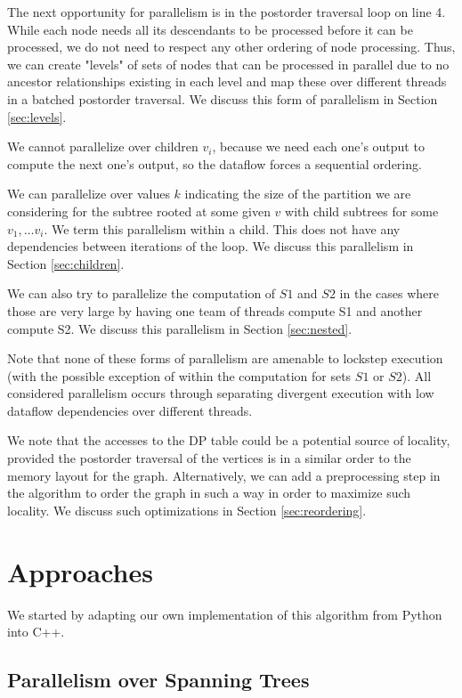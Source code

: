 \documentclass[11pt]{article}
\begin{document}
The next opportunity for parallelism is in the postorder traversal loop on line 4.
While each node needs all its descendants to be processed before it can be processed, we do not need to respect any other ordering of node processing.
Thus, we can create "levels" of sets of nodes that can be processed in parallel due to no ancestor relationships existing in each level and map these over different threads in a batched postorder traversal.
We discuss this form of parallelism in Section \ref{sec:levels}.

We cannot parallelize over children $v_i$, because we need each one's output to compute the next one's output, so the dataflow forces a sequential ordering.

We can parallelize over values $k$ indicating the size of the partition
we are considering for the subtree rooted at some given $v$ with child subtrees for some $v_1, \dots v_i$.
We term this parallelism within a child.
This does not have any dependencies between iterations of the loop.
We discuss this parallelism in Section \ref{sec:children}.

We can also try to parallelize the computation of $S1$ and $S2$ in the cases where those are very large by having one team of threads compute S1 and another compute S2.
We discuss this parallelism in Section \ref{sec:nested}.

Note that none of these forms of parallelism are amenable to lockstep execution (with the possible exception of within the computation for sets $S1$ or $S2$).
All considered parallelism occurs through separating divergent execution with low dataflow dependencies over different threads.

We note that the accesses to the DP table could be a potential source of locality, provided the postorder traversal of the vertices is in a similar order to the memory layout for the graph.
Alternatively, we can add a preprocessing step in the algorithm to order the graph in such a way in order to maximize such locality.
We discuss such optimizations in Section \ref{sec:reordering}.

\section{Approaches}

We started by adapting our own implementation of this algorithm from Python into C++.

\subsection{Parallelism over Spanning Trees}
\label{sec:trees}
\end{document}
